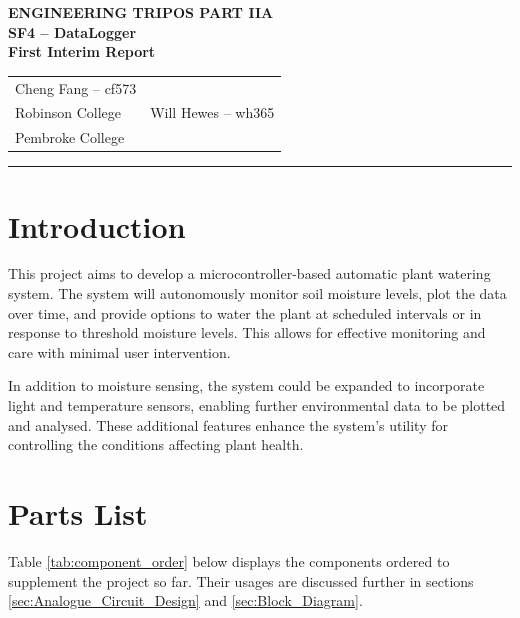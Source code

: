\documentclass[a4paper,11pt]{article}
\renewcommand{\arraystretch}{1.2}
\renewcommand{\maketitle}{
    \begin{center}
        \LARGE \textbf{ENGINEERING TRIPOS PART IIA} \\[0.5em]
        \Large \textbf{SF4 – DataLogger} \\[0.5em]
        \textbf{First Interim Report} \\[1.5em]
        \begin{tabularx}{0.7\textwidth}{X X}
            \centering \large Cheng Fang -- cf573 \\ \large Robinson College &
            \centering \large Will Hewes -- wh365 \\ \large Pembroke College
        \end{tabularx}
        \vspace{1em}
    \end{center}
}
\begin{document}
\maketitle
\hrule
\tableofcontents
\newpage

\section{Introduction}
\label{sec:Introduction}

This project aims to develop a microcontroller-based 
automatic plant watering system.
The system will autonomously monitor soil moisture levels, 
plot the data over time, and provide options to water the plant
at scheduled intervals or in response to threshold moisture levels.
This allows for effective monitoring and care with minimal user intervention.

In addition to moisture sensing, the system could be expanded to 
incorporate light and temperature sensors,
enabling further environmental data to be plotted and analysed.
These additional features enhance the system's utility
for controlling the conditions affecting plant health.

\section{Parts List}
\label{sec:Parts_List}

Table \ref{tab:component_order} below displays the components 
ordered to supplement the project so far.
Their usages are discussed further in sections 
\ref{sec:Analogue_Circuit_Design} and \ref{sec:Block_Diagram}.

\begin{table}[H]
    \centering
    \renewcommand{\arraystretch}{1.5}
    \caption{Component Order Summary}
    \label{tab:component_order}
\end{table}
\end{document}
